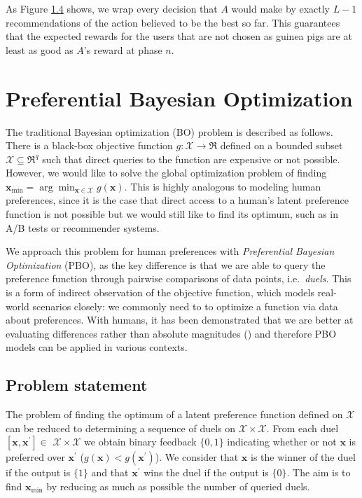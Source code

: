 \documentclass[
  letterpaper,
  numbers=noenddot,
  DIV=11]{scrreprt}
\theoremstyle{definition}
\theoremstyle{plain}
\theoremstyle{plain}
\theoremstyle{remark}
\begin{document}
As Figure \hyperref[fig-multi-armed-guinea-pig]{1.4} shows, we wrap
every decision that \(A\) would make by exactly \(L-1\) recommendations
of the action believed to be the best so far. This guarantees that the
expected rewards for the users that are not chosen as guinea pigs are at
least as good as \(A\)'s reward at phase \(n\).

\section{Preferential Bayesian
Optimization}\label{preferential-bayesian-optimization}

The traditional Bayesian optimization (BO) problem is described as
follows. There is a black-box objective function
\(g: \mathcal{X} \rightarrow \Re\) defined on a bounded subset
\(\mathcal{X} \subseteq \Re^q\) such that direct queries to the function
are expensive or not possible. However, we would like to solve the
global optimization problem of finding
\(\mathbf{x}_{\min }=\arg \min _{\mathbf{x} \in \mathcal{X}} g(\mathbf{x})\).
This is highly analogous to modeling human preferences, since it is the
case that direct access to a human's latent preference function is not
possible but we would still like to find its optimum, such as in A/B
tests or recommender systems.

We approach this problem for human preferences with \emph{Preferential
Bayesian Optimization} (PBO), as the key difference is that we are able
to query the preference function through pairwise comparisons of data
points, i.e.~\emph{duels}. This is a form of indirect observation of the
objective function, which models real-world scenarios closely: we
commonly need to to optimize a function via data about preferences. With
humans, it has been demonstrated that we are better at evaluating
differences rather than absolute magnitudes
() and
therefore PBO models can be applied in various contexts.

\subsection{Problem statement}\label{problem-statement}

The problem of finding the optimum of a latent preference function
defined on \(\mathcal{X}\) can be reduced to determining a sequence of
duels on \(\mathcal{X} \times \mathcal{X}\). From each duel
\(\left[\mathbf{x}, \mathbf{x}^{\prime}\right] \in\)
\(\mathcal{X} \times \mathcal{X}\) we obtain binary feedback \(\{0,1\}\)
indicating whether or not \(\mathbf{x}\) is preferred over
\(\mathbf{x}^{\prime}\) (\(g(\mathbf{x}) < g(\mathbf{x}^{\prime})\)). We
consider that \(\mathbf{x}\) is the winner of the duel if the output is
\(\{1\}\) and that \(\mathbf{x}^{\prime}\) wins the duel if the output
is \(\{0\}\). The aim is to find \(\mathbf{x}_{\min }\) by reducing as
much as possible the number of queried duels.
\end{document}
